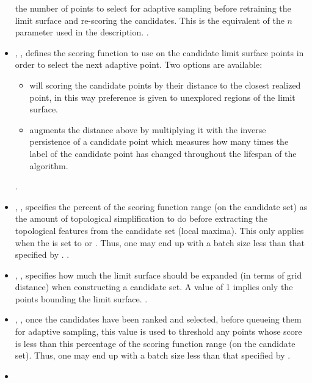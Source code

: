 \begin{itemize}
  the number of points to select for adaptive sampling before retraining the
  limit surface and re-scoring the candidates. This is the equivalent of the
  $n$ parameter used in the  description.
  .
  \item {}, , defines the scoring
    function to use on the candidate limit surface points in order to select the
    next adaptive point.
    Two options are available:
    \begin{itemize}
       \item {} will scoring the candidate points by their
       distance to the closest realized point, in this way preference is given
       to unexplored regions of the limit surface.
       \item {} augments the distance above by
       multiplying it with the inverse persistence of a candidate point which
       measures how many times the label of the candidate point has changed
       throughout the lifespan of the algorithm.
    \end{itemize}
  .
  \item {}, , specifies the percent of the scoring function range (on the candidate
  set) as the amount of topological simplification to do before extracting the
  topological features from the candidate set (local maxima). This only applies
  when the  is set to  or
  . Thus, one may end up with a batch size less than that
  specified by .
  .
  \item {}, ,
  specifies how much the limit surface should be expanded (in terms of grid
  distance) when constructing a candidate set. A value of 1 implies only the
  points bounding the limit surface.
  .
  \item {}, ,
  once the candidates have been ranked and selected, before queueing them for
  adaptive sampling, this value is used to threshold any points whose score is
  less than this percentage of the scoring function range (on the candidate
  set). Thus, one may end up with a batch size less than that specified by
  .
  \item {}

\end{itemize}

